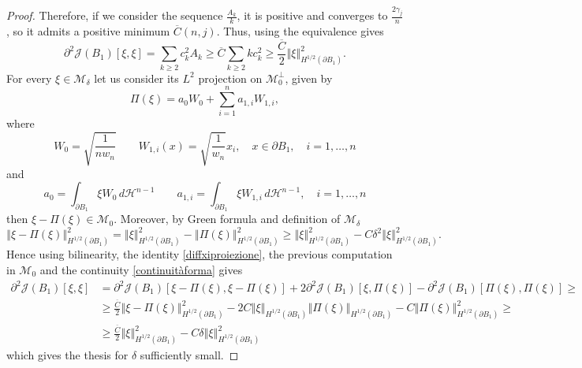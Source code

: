\documentclass[oneside,a4paper,11pt,notitlepage]{article}
\newcommand{\norma}[1]{{\left\Vert#1\right\Vert}}
\newcommand{\dH}{\,d\mathcal{H}^{n-1}}
\theoremstyle{definition}
\theoremstyle{plain}
\theoremstyle{definition}
\begin{document}
\begin{proof}
    Therefore, if we consider the sequence $\frac{A_k}{k}$, it is positive and converges to $\frac{2\gamma_j}{n}$, so it admits a positive minimum $\overline{C}(n,j)$. Thus, using the equivalence gives
    \begin{equation*}
        \partial^2 \mathcal{J}(B_1)[\xi,\xi]=\sum_{k\geq2}c_k^2A_k\geq \overline{C}\sum_{k\geq2}kc_k^2\geq\frac{\overline{C}}{2}\norma{\xi}^2_{H^{1/2}(\partial B_1)}.
    \end{equation*}
    For every $\xi\in\mathcal{M}_\delta$ let us consider its $L^2$ projection on $\mathcal{M}_0^\perp$, given by
    \begin{equation*}
        \Pi(\xi)=a_0W_0+\sum_{i=1}^na_{1,i}W_{1,i},
    \end{equation*}
    where
    \begin{equation*}
        W_0=\sqrt{\frac{1}{nw_n}}\qquad W_{1,i}(x)=\sqrt{\frac{1}{w_n}}x_i,\quad x\in\partial B_1,\quad i=1,\dots,n
    \end{equation*}
    and
    \begin{equation*}
        a_0=\int_{\partial B_1}\xi W_0\dH\qquad a_{1,i}=\int_{\partial B_1}\xi W_{1,i}\dH,\quad i=1,\dots,n
    \end{equation*}
    then $\xi-\Pi(\xi)\in\mathcal{M}_0$. Moreover, by Green formula and definition of $\mathcal{M}_\delta$
    \begin{equation}\label{diffxiproiezione}
        \norma{\xi-\Pi(\xi)}^2_{H^{1/2}(\partial B_1)}=\norma{\xi}^2_{H^{1/2}(\partial B_1)}-\norma{\Pi(\xi)}^2_{H^{1/2}(\partial B_1)}\geq\norma{\xi}^2_{H^{1/2}(\partial B_1)}-C\delta^2\norma{\xi}^2_{H^{1/2}(\partial B_1)}.
    \end{equation}
    Hence using bilinearity, the identity \eqref{diffxiproiezione}, the previous computation in $\mathcal{M}_0$ and the continuity \ref{continuitàforma} gives
    \begin{equation*}
        \begin{split}
            \partial^2\mathcal{J}(B_1)[\xi,\xi]&=\partial^2\mathcal{J}(B_1)[\xi-\Pi(\xi),\xi-\Pi(\xi)]+2\partial^2\mathcal{J}(B_1)[\xi,\Pi(\xi)]-\partial^2\mathcal{J}(B_1)[\Pi(\xi),\Pi(\xi)]\geq\\
            &\geq \frac{\overline{C}}{2}\norma{\xi-\Pi(\xi)}^2_{H^{1/2}(\partial B_1)}-2C\norma{\xi}_{H^{1/2}(\partial B_1)}\norma{\Pi(\xi)}_{H^{1/2}(\partial B_1)}-C\norma{\Pi(\xi)}^2_{H^{1/2}(\partial B_1)}\geq\\
            &\geq\frac{\overline{C}}{2}\norma{\xi}^2_{H^{1/2}(\partial B_1)}-C\delta\norma{\xi}^2_{H^{1/2}(\partial B_1)}
        \end{split}
    \end{equation*}
    which gives the thesis for $\delta$ sufficiently small.
\end{proof}
\end{document}
